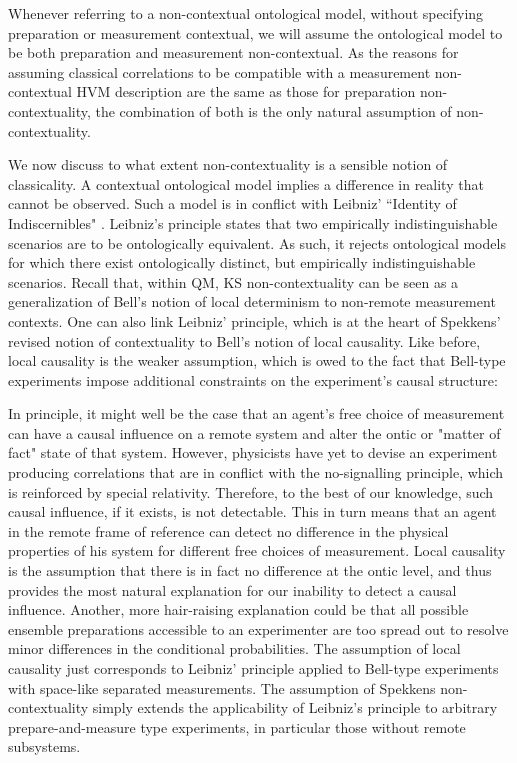 Whenever referring to a non-contextual ontological model, without specifying preparation or measurement contextual, we  will assume the ontological model to be both preparation and measurement non-contextual. As the reasons for assuming classical correlations to be compatible with a measurement non-contextual HVM description are the same as those for preparation non-contextuality, the combination of both is the only natural assumption of non-contextuality.

We now discuss to what extent non-contextuality is a sensible notion of classicality. A contextual ontological model implies a difference in reality that cannot be observed. Such a model is in conflict with Leibniz' ``Identity of Indiscernibles" \cite{Buchanan2019,Spekkens2019}. Leibniz's principle states that two empirically indistinguishable scenarios are to be ontologically equivalent. As such, it rejects ontological models for which there exist ontologically distinct, but empirically indistinguishable scenarios. Recall that, within QM, KS non-contextuality can be seen as a generalization of Bell's notion of local determinism to non-remote measurement contexts. One can also link Leibniz' principle, which is at the heart of Spekkens' revised notion of contextuality to Bell's notion of local causality. Like before, local causality is the weaker assumption, which is owed to the fact that Bell-type experiments impose additional constraints on the experiment's causal structure:

In principle, it might well be the case that an agent's free choice of measurement can have a causal influence on a remote system and alter the ontic or "matter of fact" state of that system. However, physicists have yet to devise an experiment producing correlations that are in conflict with the no-signalling principle, which is reinforced by special relativity. Therefore, to the best of our knowledge, such causal influence, if it exists, is not detectable. This in turn means that an agent in the remote frame of reference can detect no difference in the physical properties of his system for different free choices of measurement. Local causality is the assumption that there is in fact no difference at the ontic level, and thus provides the most natural explanation for our inability to detect a causal influence. Another, more hair-raising explanation could be that all possible ensemble preparations accessible to an experimenter are too spread out to resolve minor differences in the conditional probabilities. The assumption of local causality just corresponds to Leibniz' principle applied to Bell-type experiments with space-like separated measurements. The assumption of Spekkens non-contextuality simply extends the applicability of Leibniz's principle to arbitrary prepare-and-measure type experiments, in particular those without remote subsystems.

